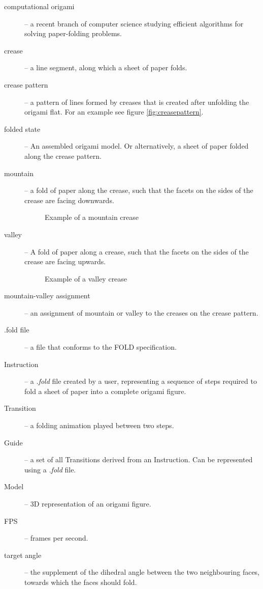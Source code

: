 \begin{description}
	\item[computational origami] \label{dictionary:computational-origami} -- a recent branch of computer science studying efficient algorithms for solving paper-folding problems.\cite{recent-results-in-computational-origami:paper}
	\item[crease] -- a line segment, along which a sheet of paper folds.
	\item[crease pattern] \label{dictionary:crease-pattern} -- a pattern of lines formed by creases that is created after unfolding the origami flat. For an example see figure \ref{fig:creasepattern}.
	\item[folded state] \label{dictionary:folded-state} -- An assembled origami model. Or alternatively, a sheet of paper folded along the crease pattern.
	\item[mountain] -- a fold of paper along the crease, such that the facets on the sides of the crease are facing downwards.
					\begin{figure}[H]
						\caption{Example of a mountain crease}
						\centering
					\end{figure}
	\item[valley] -- A fold of paper along a crease, such that the facets on the sides of the crease are facing upwards.
					\begin{figure}[H]
						\caption{Example of a valley crease}
						\centering
					\end{figure}
	\item[mountain-valley assignment] -- an assignment of mountain or valley to the creases on the crease pattern.
	\item[.fold file] -- a file that conforms to the FOLD\cite{fold:paper} specification.
	\item[Instruction] -- a \textit{.fold} file created by a user, representing a sequence of steps required to
		fold a sheet of paper into a complete origami figure.
	\item[Transition] -- a folding animation played between two steps.
	\item[Guide] -- a set of all Transitions derived from an Instruction. Can be represented using a \textit{.fold} file.
	\item[Model] -- 3D representation of an origami figure. 
	\item[FPS] -- frames per second.
	\item[target angle] -- the supplement of the dihedral angle between the two neighbouring faces,
		towards which the faces should fold.
\end{description}

